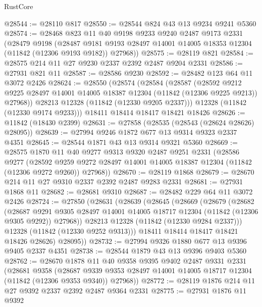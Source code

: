 \begin{lexlean}{RustCore}
\begin{coremodule}
@28544 := @28110 @817
@28550 := @28544 @824 @43 @13 @9234 @9241 @5360
@28574 := @28468
    @823
    @11
    @40
    @9198
    @9233
    @9240
    @2487
    @9173
    @2331
    (@28479
      @9198
      (@28487 @9181 @9193 @28497 @14001 @14005 @18353 @12304 (@11842 (@12306 @9193 @9182)) @27968))
@28575 := @28119 @821
@28584 := @28575 @214 @11 @27 @9230 @2337 @2392 @2487 @9204 @2331
@28586 := @27931 @821 @11
@28587 := @28586 @9230
@28592 := @28482 @123 @64 @11 @3072 @2426
@28624 := @28550
    (@28574
      (@28584
        (@28587
          (@28592
            @9212
            @9225
            @28497
            @14001
            @14005
            @18387
            @12304
            (@11842 (@12306 @9225 @9213))
            @27968))
        @28213
        @12328
        (@11842 (@12330 @9205 @2337)))
      @12328
      (@11842 (@12330 @9174 @9233)))
    @18411
    @18414
    @18417
    @18421
    @18426
@28626 := @11842 (@18430 @2399)
@28631 := @27858 (@28535 (@28543 (@28624 @28626) @28095))
@28639 := @27994 @9246 @1872 @677 @13 @9314 @9323 @2337 @4351
@28645 := @28544 @1871 @43 @13 @9314 @9321 @5360
@28669 := @28575
    @1870
    @11
    @40
    @9277
    @9313
    @9320
    @2487
    @9251
    @2331
    (@28586
      @9277
      (@28592 @9259 @9272 @28497 @14001 @14005 @18387 @12304 (@11842 (@12306 @9272 @9260)) @27968))
@28670 := @28119 @1868
@28679 := @28670 @214 @11 @27 @9310 @2337 @2392 @2487 @9283 @2331
@28681 := @27931 @1868 @11
@28682 := @28681 @9310
@28687 := @28482 @229 @64 @11 @3072 @2426
@28724 := @27850
    (@28631
      (@28639
        (@28645
          (@28669
            (@28679
              (@28682
                (@28687
                  @9291
                  @9305
                  @28497
                  @14001
                  @14005
                  @18717
                  @12304
                  (@11842 (@12306 @9305 @9292))
                  @27968))
              @28213
              @12328
              (@11842 (@12330 @9284 @2337)))
            @12328
            (@11842 (@12330 @9252 @9313)))
          @18411
          @18414
          @18417
          @18421
          @18426
          @28626)
        @28095))
@28732 := @27994 @9326 @1880 @677 @13 @9396 @9405 @2337 @4351
@28738 := @28544 @1879 @43 @13 @9396 @9403 @5360
@28762 := @28670
    @1878
    @11
    @40
    @9358
    @9395
    @9402
    @2487
    @9331
    @2331
    (@28681
      @9358
      (@28687 @9339 @9353 @28497 @14001 @14005 @18717 @12304 (@11842 (@12306 @9353 @9340)) @27968))
@28772 := @28119 @1876 @214 @11 @27 @9392 @2337 @2392 @2487 @9364 @2331
@28775 := @27931 @1876 @11 @9392

\end{coremodule}
\end{lexlean}
